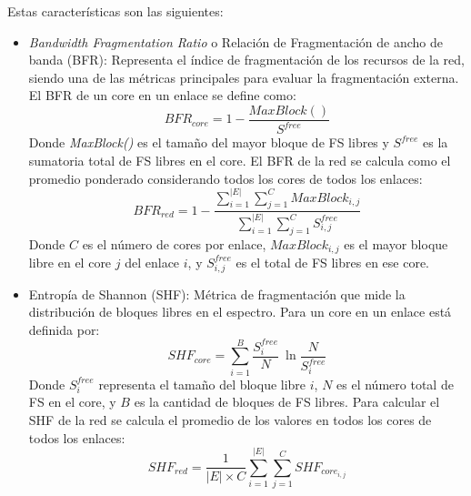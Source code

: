 Estas características son las siguientes: 

\begin{itemize}
    \item \textit{Bandwidth Fragmentation Ratio} o Relación de Fragmentación de ancho de banda (BFR)\cite{zhang2013bandwidth}: Representa el índice de fragmentación de los recursos de la red, siendo una de las métricas principales para evaluar la fragmentación externa. El BFR de un core en un enlace se define como:
    \begin{equation}
        BFR_{core} = 1 - \frac{MaxBlock()}{S^{free}}
    \end{equation}
    Donde \textit{MaxBlock()} es el tamaño del mayor bloque de FS libres y \(S^{free}\) es la sumatoria total de FS libres en el core.
    El BFR de la red se calcula como el promedio ponderado considerando todos los cores de todos los enlaces:
    \begin{equation}
       BFR_{red} = 1 - \frac{\sum_{i=1}^{\left | E \right |} \sum_{j=1}^{C} MaxBlock_{i,j}}{\sum_{i=1}^{\left | E \right |} \sum_{j=1}^{C} S^{free}_{i,j}}
    \end{equation}
    Donde \(C\) es el número de cores por enlace, \(MaxBlock_{i,j}\) es el mayor bloque libre en el core \(j\) del enlace \(i\), y \(S^{free}_{i,j}\) es el total de FS libres en ese core.
    
    \item Entropía de Shannon (SHF)\cite{wright2015minimum}: Métrica de fragmentación que mide la distribución de bloques libres en el espectro. Para un core en un enlace está definida por:
    \begin{equation}
        SHF_{core} = \sum_{i=1}^{B} \frac{S_{i}^{free}}{N}~\ln\frac{N}{S_{i}^{free}}
    \end{equation}
    Donde \(S_{i}^{free}\) representa el tamaño del bloque libre \(i\), \(N\) es el número total de FS en el core, y \(B\) es la cantidad de bloques de FS libres. Para calcular el SHF de la red se calcula el promedio de los valores en todos los cores de todos los enlaces:
    \begin{equation}
        SHF_{red} = \frac{1}{\left | E \right | \times C} \sum_{i=1}^{\left | E \right |} \sum_{j=1}^{C} SHF_{core_{i,j}}
    \end{equation}
    

\end{itemize}

